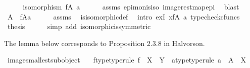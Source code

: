 \begin{isabellebody}
\ \ \isamarkupfalse%
\ \isamarkupfalse%
\ {\isachardoublequoteopen}isomorphism\ {\isacharparenleft}{\kern0pt}f{\isasymrestriction}\isactrlbsub {\isacharparenleft}{\kern0pt}A{\isacharcomma}{\kern0pt}\ a{\isacharparenright}{\kern0pt}\isactrlesub {\isacharparenright}{\kern0pt}{\isachardoublequoteclose}\isanewline
\ \ \ \ \isamarkupfalse%
\ assms\ epi{\isacharunderscore}{\kern0pt}mon{\isacharunderscore}{\kern0pt}is{\isacharunderscore}{\kern0pt}iso\ image{\isacharunderscore}{\kern0pt}rest{\isacharunderscore}{\kern0pt}map{\isacharunderscore}{\kern0pt}epi\ \isamarkupfalse%
\ blast\isanewline
\ \ \isamarkupfalse%
\ \isamarkupfalse%
\ {\isachardoublequoteopen}A\ {\isasymcong}\ f{\isasymlparr}A{\isasymrparr}\isactrlbsub a\isactrlesub {\isachardoublequoteclose}\isanewline
\ \ \ \ \isamarkupfalse%
\ assms\ \isamarkupfalse%
\ is{\isacharunderscore}{\kern0pt}isomorphic{\isacharunderscore}{\kern0pt}def\ \isamarkupfalse%
\ {\isacharparenleft}{\kern0pt}intro\ exI{\isacharbrackleft}{\kern0pt}\ x{\isacharequal}{\kern0pt}{\isachardoublequoteopen}f{\isasymrestriction}\isactrlbsub {\isacharparenleft}{\kern0pt}A{\isacharcomma}{\kern0pt}\ a{\isacharparenright}{\kern0pt}\isactrlesub {\isachardoublequoteclose}{\isacharbrackright}{\kern0pt}{\isacharcomma}{\kern0pt}\ typecheck{\isacharunderscore}{\kern0pt}cfuncs{\isacharparenright}{\kern0pt}\isanewline
\ \ \isamarkupfalse%
\ \isamarkupfalse%
\ {\isacharquery}{\kern0pt}thesis\isanewline
\ \ \ \ \isamarkupfalse%
\ {\isacharparenleft}{\kern0pt}simp\ add{\isacharcolon}{\kern0pt}\ isomorphic{\isacharunderscore}{\kern0pt}is{\isacharunderscore}{\kern0pt}symmetric{\isacharparenright}{\kern0pt}\isanewline
{}\isamarkupfalse%
%
\endisatagproof
{\isafoldproof}%
%
\isadelimproof
%
\endisadelimproof
%
\begin{isamarkuptext}%
The lemma below corresponds to Proposition 2.3.8 in Halvorson.%
\end{isamarkuptext}\isamarkuptrue%
\isamarkupfalse%
\ image{\isacharunderscore}{\kern0pt}smallest{\isacharunderscore}{\kern0pt}subobject{\isacharcolon}{\kern0pt}\isanewline
\ \ \ f{\isacharunderscore}{\kern0pt}type{\isacharbrackleft}{\kern0pt}type{\isacharunderscore}{\kern0pt}rule{\isacharbrackright}{\kern0pt}{\isacharcolon}{\kern0pt}\ {\isachardoublequoteopen}f\ {\isacharcolon}{\kern0pt}\ X\ {\isasymrightarrow}\ Y{\isachardoublequoteclose}\ \ a{\isacharunderscore}{\kern0pt}type{\isacharbrackleft}{\kern0pt}type{\isacharunderscore}{\kern0pt}rule{\isacharbrackright}{\kern0pt}{\isacharcolon}{\kern0pt}\ {\isachardoublequoteopen}a\ {\isacharcolon}{\kern0pt}\ A\ {\isasymrightarrow}\ X{\isachardoublequoteclose}\isanewline

\end{isabellebody}
